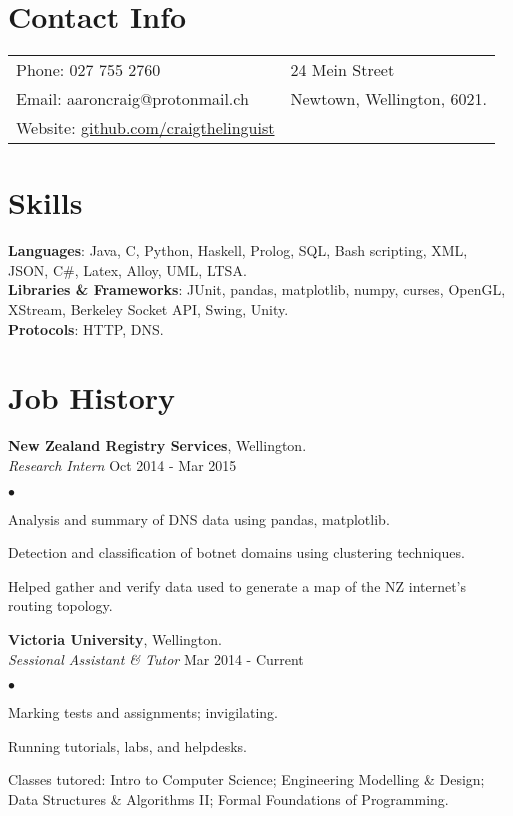 \documentclass[margin,line]{res}
\newenvironment{list2}{
  \begin{list}{$\bullet$}{%
      \setlength{\itemsep}{0in}
      \setlength{\parsep}{0in} \setlength{\parskip}{0in}
      \setlength{\topsep}{0in} \setlength{\partopsep}{0in}
      \setlength{\leftmargin}{0.2in}}}{\end{list}}
\begin{document}

\begin{resume}
	\section{\sc Contact Info}

\vspace{.05in}
\begin{tabular}{@{}p{3.5in}p{3in}}
{Phone}: 027 755 2760 & 24 Mein Street \\
{Email}: aaroncraig@protonmail.ch & Newtown, Wellington, 6021. \\
{Website}: \url{github.com/craigthelinguist}

\end{tabular}

\section{\sc Skills}

{\bf Languages}: Java, C, Python, Haskell, Prolog, SQL, Bash scripting, XML, JSON, C\#, Latex, Alloy, UML, LTSA.\\
{\bf Libraries \& Frameworks}: JUnit, pandas, matplotlib, numpy, curses, OpenGL, XStream, Berkeley Socket API, Swing, Unity.\\
{\bf Protocols}: HTTP, DNS.


\section{\sc Job History}
{\bf New Zealand Registry Services}, Wellington.\\
{\em Research Intern} \hfill {Oct 2014 - Mar 2015}
\begin{list2}
	\item Analysis and summary of DNS data using pandas, matplotlib.
	\item Detection and classification of botnet domains using clustering techniques.
	\item Helped gather and verify data used to generate a map of the NZ internet's routing topology.
\end{list2}

{\bf Victoria University}, Wellington.\\
{\em Sessional Assistant \& Tutor} \hfill {Mar 2014 - Current}
\begin{list2} %
	\item Marking tests and assignments; invigilating.
	\item Running tutorials, labs, and helpdesks.
	\item Classes tutored: Intro to Computer Science; Engineering Modelling \& Design; Data Structures \& Algorithms 				II; Formal Foundations of Programming.
\end{list2}


\end{resume}
\end{document}
